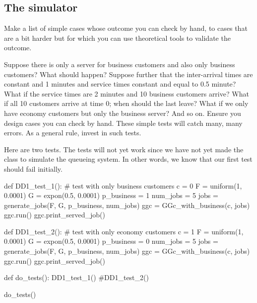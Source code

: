 \subsection{The simulator}
\label{sec:simulator-1}

\begin{exercise}
  Make a list of  simple cases whose outcome you can check by hand, to cases that are a bit harder but for which  you can use theoretical tools to validate the outcome.
  \begin{hint}
    Suppose there is only a server for business customers and also only business customers?
    What should happen?
    Suppose further that the inter-arrival times are constant and 1 minutes and service times constant and equal to 0.5 minute?
    What if the service times are 2 minutes and 10 business customers arrive?
    What if all 10 customers arrive at time 0; when should the last leave?
    What if we only have economy customers but only the business server?
    And so on.
    Ensure you design cases you can check by hand.
    These simple tests will catch many, many errors.
    As a general rule, invest in such tests.
  \end{hint}
  

  \begin{solution}
    Here are two tests.
    The tests will not yet work since we have not yet made the class to simulate the queueing system.
    In other words, we know that our first test should fail initially.

    \begin{pyverbatim}
def DD1_test_1():
    # test with only business customers
    c = 0
    F = uniform(1, 0.0001)
    G = expon(0.5, 0.0001)
    p_business = 1
    num_jobs = 5
    jobs = generate_jobs(F, G, p_business, num_jobs)
    ggc = GGc_with_business(c, jobs)
    ggc.run()
    ggc.print_served_job()
    

def DD1_test_2():
    # test with only economy customers
    c = 1
    F = uniform(1, 0.0001)
    G = expon(0.5, 0.0001)
    p_business = 0
    num_jobs = 5
    jobs = generate_jobs(F, G, p_business, num_jobs)
    ggc = GGc_with_business(c, jobs)
    ggc.run()
    ggc.print_served_job()

def do_tests():
    DD1_test_1()
    #DD1_test_2()

do_tests()
    \end{pyverbatim}

  \end{solution}

\end{exercise}


